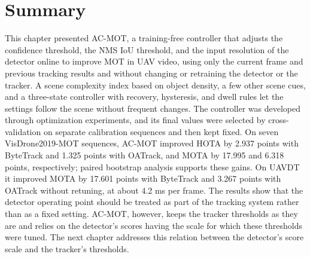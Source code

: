 \section{Summary}\label{sec:ac-summary}
This chapter presented AC-MOT, a training-free controller that adjusts the confidence threshold, the NMS IoU threshold, and the input resolution of the detector online to improve MOT in UAV video, using only the current frame and previous tracking results and without changing or retraining the detector or the tracker. A scene complexity index based on object density, a few other scene cues, and a three-state controller with recovery, hysteresis, and dwell rules let the settings follow the scene without frequent changes. The controller was developed through optimization experiments, and its final values were selected by cross-validation on separate calibration sequences and then kept fixed. On seven VisDrone2019-MOT sequences, AC-MOT improved HOTA by 2.937 points with ByteTrack and 1.325 points with OATrack, and MOTA by 17.995 and 6.318 points, respectively; paired bootstrap analysis supports these gains. On UAVDT it improved MOTA by 17.601 points with ByteTrack and 3.267 points with OATrack without retuning, at about 4.2 ms per frame. The results show that the detector operating point should be treated as part of the tracking system rather than as a fixed setting. AC-MOT, however, keeps the tracker thresholds as they are and relies on the detector's scores having the scale for which these thresholds were tuned. The next chapter addresses this relation between the detector's score scale and the tracker's thresholds.
